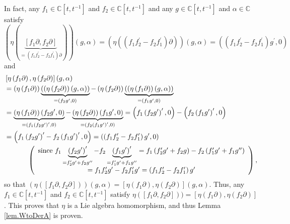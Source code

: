 \documentclass
[numbers=enddot,12pt,final,onecolumn,german,notitlepage]{scrartcl}%
\theoremstyle{definition}
\begin{document}
In fact, any $f_{1}\in\mathbb{C}\left[  t,t^{-1}\right]  $ and $f_{2}%
\in\mathbb{C}\left[  t,t^{-1}\right]  $ and any $g\in\mathbb{C}\left[
t,t^{-1}\right]  $ and $\alpha\in\mathbb{C}$ satisfy%
\[
\left(  \eta\left(  \underbrace{\left[  f_{1}\partial,f_{2}\partial\right]
}_{=\left(  f_{1}f_{2}^{\prime}-f_{2}f_{1}^{\prime}\right)  \partial}\right)
\right)  \left(  g,\alpha\right)  =\left(  \eta\left(  \left(  f_{1}%
f_{2}^{\prime}-f_{2}f_{1}^{\prime}\right)  \partial\right)  \right)  \left(
g,\alpha\right)  =\left(  \left(  f_{1}f_{2}^{\prime}-f_{2}f_{1}^{\prime
}\right)  g^{\prime},0\right)
\]
and%
\begin{align*}
&  \left[  \eta\left(  f_{1}\partial\right)  ,\eta\left(  f_{2}\partial
\right)  \right]  \left(  g,\alpha\right) \\
&  =\left(  \eta\left(  f_{1}\partial\right)  \right)  \underbrace{\left(
\left(  \eta\left(  f_{2}\partial\right)  \right)  \left(  g,\alpha\right)
\right)  }_{=\left(  f_{2}g^{\prime},0\right)  }-\left(  \eta\left(
f_{2}\partial\right)  \right)  \underbrace{\left(  \left(  \eta\left(
f_{1}\partial\right)  \right)  \left(  g,\alpha\right)  \right)  }_{=\left(
f_{1}g^{\prime},0\right)  }\\
&  =\underbrace{\left(  \eta\left(  f_{1}\partial\right)  \right)  \left(
f_{2}g^{\prime},0\right)  }_{=\left(  f_{1}\left(  f_{2}g^{\prime}\right)
^{\prime},0\right)  }-\underbrace{\left(  \eta\left(  f_{2}\partial\right)
\right)  \left(  f_{1}g^{\prime},0\right)  }_{=\left(  f_{2}\left(
f_{1}g^{\prime}\right)  ^{\prime},0\right)  }=\left(  f_{1}\left(
f_{2}g^{\prime}\right)  ^{\prime},0\right)  -\left(  f_{2}\left(
f_{1}g^{\prime}\right)  ^{\prime},0\right) \\
&  =\left(  f_{1}\left(  f_{2}g^{\prime}\right)  ^{\prime}-f_{2}\left(
f_{1}g^{\prime}\right)  ^{\prime},0\right)  =\left(  \left(  f_{1}%
f_{2}^{\prime}-f_{2}f_{1}^{\prime}\right)  g^{\prime},0\right) \\
&  \ \ \ \ \ \ \ \ \ \ \left(
\begin{array}
[c]{c}%
\text{since }f_{1}\underbrace{\left(  f_{2}g^{\prime}\right)  ^{\prime}%
}_{=f_{2}^{\prime}g^{\prime}+f_{2}g^{\prime\prime}}-f_{2}\underbrace{\left(
f_{1}g^{\prime}\right)  ^{\prime}}_{=f_{1}^{\prime}g^{\prime}+f_{1}%
g^{\prime\prime}}=f_{1}\left(  f_{2}^{\prime}g^{\prime}+f_{2}g\right)
-f_{2}\left(  f_{1}^{\prime}g^{\prime}+f_{1}g^{\prime\prime}\right) \\
=f_{1}f_{2}^{\prime}g^{\prime}-f_{2}f_{1}^{\prime}g^{\prime}=\left(
f_{1}f_{2}^{\prime}-f_{2}f_{1}^{\prime}\right)  g^{\prime}%
\end{array}
\right)  ,
\end{align*}
so that $\left(  \eta\left(  \left[  f_{1}\partial,f_{2}\partial\right]
\right)  \right)  \left(  g,\alpha\right)  =\left[  \eta\left(  f_{1}%
\partial\right)  ,\eta\left(  f_{2}\partial\right)  \right]  \left(
g,\alpha\right)  $. Thus, any $f_{1}\in\mathbb{C}\left[  t,t^{-1}\right]  $
and $f_{2}\in\mathbb{C}\left[  t,t^{-1}\right]  $ satisfy $\eta\left(  \left[
f_{1}\partial,f_{2}\partial\right]  \right)  )=\left[  \eta\left(
f_{1}\partial\right)  ,\eta\left(  f_{2}\partial\right)  \right]  $. This
proves that $\eta$ is a Lie algebra homomorphism, and thus Lemma
\ref{lem.WtoDerA} is proven.
\end{document}
